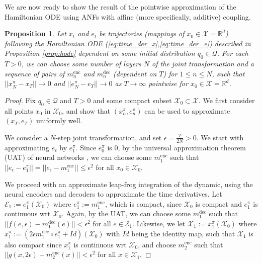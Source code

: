 \documentclass{article}
\def\gE{{\mathcal{E}}}
\def\gQ{{\mathcal{Q}}}
\def\gX{{\mathcal{X}}}
\newcommand{\R}{\mathbb{R}}
\newcommand{\e}{\epsilon}
\newtheorem{proposition}{Proposition}
\begin{document}
We are now ready to show the result of the pointwise approximation of the Hamiltonian ODE using ANFs with affine (more specifically, additive) coupling. 
\begin{proposition}
\label{prop:anf_pointwise}
Let $x_t$ and $e_t$ be trajectories (mappings of $x_0\in\gX=\R^d$) following the Hamiltonian ODE (\ref{eq:time_der_x},\ref{eq:time_der_e}) described in Proposition \ref{prop:hode} dependent on some initial distribution $q_0 \in \gQ$. 
For each $T>0$, we can choose some number of layers $N$ of the joint transformation and a sequence of pairs of $m^\text{enc}_n$ and $m^\text{dec}_n$ (dependent on $T$) for $1\leq n\leq N$, such that $||x^\pi_N - x_T||\rightarrow0$ and $||e^\pi_N - e_T||\rightarrow0$ as $T\rightarrow\infty$ pointwise for $x_0\in\gX=\R^d$. 
\end{proposition}
\begin{proof}
Fix $q_0\in\gQ$ and $T>0$ and some compact subset $\gX_0\subset\gX$.
We first consider all points $x_0$ in $\gX_0$, and show that $(x^\pi_n, e^\pi_n)$ can be used to approximate $(x_T,e_T)$ uniformly well. 

We consider a $N$-step joint transformation, and set $\e=\frac{T}{2N}>0$. 
We start with approximating $e_{\e}$ by $e^\pi_1$.
Since $e^\pi_0$ is $0$, by the universal approximation theorem (UAT) of neural networks \citep{cybenko1989approximation}, we can choose some $m^\text{enc}_1$ such that $||e_\e - e^\pi_1||=||e_\e - m^\text{enc}_1||\leq \e^2$ for all $x_0\in\gX_0$.

We proceed with an approximate leap-frog integration of the dynamic, using the neural encoders and decoders to approximate the time derivatives. 
Let $\gE_1:=e^\pi_1(\gX_0)$ where $e^\pi_1:=m^\text{enc}_1$, which is compact, since $\gX_0$ is compact and $e^\pi_1$ is continuous wrt $\gX_0$.
Again, by the UAT, we can choose some $m^\text{dec}_1$ such that $||f(e,\e)-m^\text{dec}_1(e)||<\e^2$ for all $e\in\gE_1$. 
Likewise, we let $\gX_1:=x^\pi_1(\gX_0)$ where $x^\pi_1:=(2\e m^\text{dec}_1 \circ e^\pi_1  + Id)(\gX_0)$ with $Id$ being the identity map, such that $\gX_1$ is also compact since $x^\pi_1$ is continuous wrt $\gX_0$, and choose $m^\text{enc}_2$ such that $||g(x,2\e)-m^\text{enc}_2(x)||<\e^2$ for all $x\in\gX_1$.


\end{proof}
\end{document}
